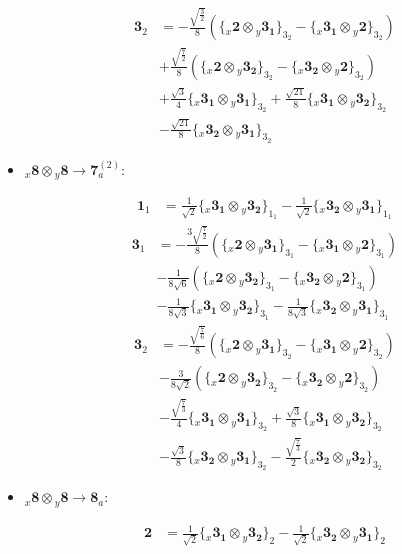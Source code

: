 \documentclass[english]{article}
\newcommand{\rep}[1]{\mathbf{#1}}
\newcommand{\repx}[2]{{}_{#2}\mathbf{#1}}
\newcommand{\tsprodx}[2]{\repx{#1}{x}\otimes\repx{#2}{y}}
\newcommand{\subcgs}[3]{\big\{ \tsprodx{#1}{#2}\big\}^{}_{#3}}
\begin{document}
\begin{itemize}
\begin{fleqn}
\begin{align*}
\end{align*}
\begin{align*}
\rep{3}_{2} & = -\frac{\sqrt{\frac{3}{2}}}{8}\left(\subcgs{2}{3_{1}}{3_{2}}-\subcgs{3_{1}}{2}{3_{2}}\right) \\ 
 & +\frac{\sqrt{\frac{7}{2}}}{8}\left(\subcgs{2}{3_{2}}{3_{2}}-\subcgs{3_{2}}{2}{3_{2}}\right) \\ 
 & +\frac{\sqrt{3}}{4}\subcgs{3_{1}}{3_{1}}{3_{2}}+\frac{\sqrt{21}}{8}\subcgs{3_{1}}{3_{2}}{3_{2}} \\ 
 & -\frac{\sqrt{21}}{8}\subcgs{3_{2}}{3_{1}}{3_{2}}
\end{align*}
\end{fleqn}
\item $\tsprodx{8}{8}\to\rep{7}_{a}^{(2)}$:
\begin{fleqn}
\begin{align*}
\rep{1}_{1} & = \frac{1}{\sqrt{2}}\subcgs{3_{1}}{3_{2}}{1_{1}}-\frac{1}{\sqrt{2}}\subcgs{3_{2}}{3_{1}}{1_{1}}
\end{align*}
\begin{align*}
\rep{3}_{1} & = -\frac{3 \sqrt{\frac{7}{2}}}{8}\left(\subcgs{2}{3_{1}}{3_{1}}-\subcgs{3_{1}}{2}{3_{1}}\right) \\ 
 & -\frac{1}{8 \sqrt{6}}\left(\subcgs{2}{3_{2}}{3_{1}}-\subcgs{3_{2}}{2}{3_{1}}\right) \\ 
 & -\frac{1}{8 \sqrt{3}}\subcgs{3_{1}}{3_{2}}{3_{1}}-\frac{1}{8 \sqrt{3}}\subcgs{3_{2}}{3_{1}}{3_{1}}
\end{align*}
\begin{align*}
\rep{3}_{2} & = -\frac{\sqrt{\frac{7}{6}}}{8}\left(\subcgs{2}{3_{1}}{3_{2}}-\subcgs{3_{1}}{2}{3_{2}}\right) \\ 
 & -\frac{3}{8 \sqrt{2}}\left(\subcgs{2}{3_{2}}{3_{2}}-\subcgs{3_{2}}{2}{3_{2}}\right) \\ 
 & -\frac{\sqrt{\frac{7}{3}}}{4}\subcgs{3_{1}}{3_{1}}{3_{2}}+\frac{\sqrt{3}}{8}\subcgs{3_{1}}{3_{2}}{3_{2}} \\ 
 & -\frac{\sqrt{3}}{8}\subcgs{3_{2}}{3_{1}}{3_{2}}-\frac{\sqrt{\frac{7}{3}}}{2}\subcgs{3_{2}}{3_{2}}{3_{2}}
\end{align*}
\end{fleqn}
\item $\tsprodx{8}{8}\to\rep{8}_{a}$:
\begin{fleqn}
\begin{align*}
\rep{2} & = \frac{1}{\sqrt{2}}\subcgs{3_{1}}{3_{2}}{2}-\frac{1}{\sqrt{2}}\subcgs{3_{2}}{3_{1}}{2}
\end{align*}
\begin{align*}

\end{align*}
\end{fleqn}
\end{itemize}
\end{document}
